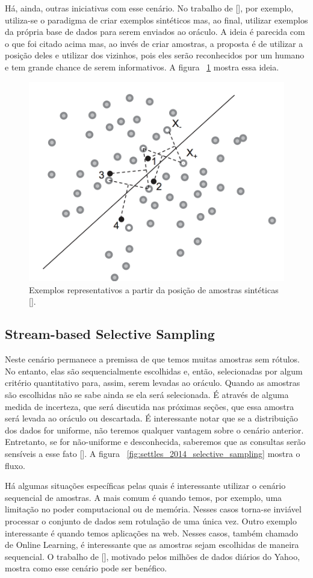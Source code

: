 Há, ainda, outras iniciativas com esse cenário. No trabalho de [\cite{wang2015active}], por exemplo, utiliza-se o paradigma de criar exemplos sintéticos mas, ao final, utilizar exemplos da própria base de dados para serem enviados ao oráculo. A ideia é parecida com o que foi citado acima mas, ao invés de criar amostras, a proposta é de utilizar a posição deles e utilizar dos vizinhos, pois eles serão reconhecidos por um humano e tem grande chance de serem informativos. A figura ~\ref{fig:wang_2015_membership}  mostra essa ideia. 

\begin{figure}
  \centering
  \includegraphics[width=.5\textwidth]{figures/wang_2015_membership.png}
  \caption{Exemplos representativos a partir da posição de amostras sintéticas [\cite{wang2015active}].}
  \label{fig:wang_2015_membership}
\end{figure}


\subsection{Stream-based Selective Sampling}
\label{sec:cenarios_selective_sampling}

Neste cenário permanece a premissa de que temos muitas amostras sem rótulos. No entanto, elas são sequencialmente escolhidas e, então, selecionadas por algum critério quantitativo para, assim, serem levadas ao oráculo. Quando as amostras são escolhidas não se sabe ainda se ela será selecionada. É através de alguma medida de incerteza, que será discutida nas próximas seções, que essa amostra será levada ao oráculo ou descartada. É interessante notar que se a distribuição dos dados for uniforme, não teremos qualquer vantagem sobre o cenário anterior. Entretanto, se for não-uniforme e desconhecida, saberemos que as consultas serão sensíveis a esse fato [\cite{settles2014active}]. A figura ~\ref{fig:settles_2014_selective_sampling} mostra o fluxo. 

Há algumas situações específicas pelas quais é interessante utilizar o cenário sequencial de amostras. A mais comum é quando temos, por exemplo, uma limitação no poder computacional ou de memória. Nesses casos torna-se inviável processar o conjunto de dados sem rotulação de uma única vez. Outro exemplo interessante é quando temos aplicações na web. Nesses casos, também chamado de Online Learning, é interessante que as amostras sejam escolhidas de maneira sequencial. O trabalho de [\cite{chu2011unbiased}], motivado pelos milhões de dados diários do Yahoo, mostra como esse cenário pode ser benéfico. 


